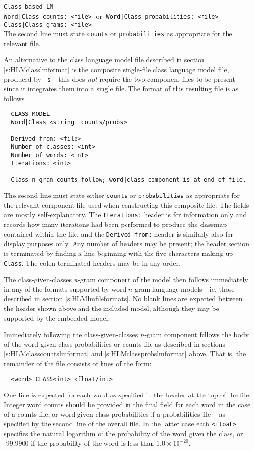 \noindent\texttt{Class-based LM}\\
\texttt{Word|Class counts: <file>} $\;$or$\;$ \texttt{Word|Class probabilities: <file>}\\
\texttt{Class|Class grams: <file>}\\
The second line must state {\tt counts} or {\tt probabilities} as
appropriate for the relevant file.


An alternative to the class language model file described in section
\ref{s:HLMclasslmformat} is the composite single-file class language
model file, produced by { \tt -s} -- this does {\it not}
require the two component files to be present since it integrates them
into a single file.  The format of this resulting file is as follows:

\begin{verbatim}
  CLASS MODEL
  Word|Class <string: counts/probs>

  Derived from: <file>
  Number of classes: <int>
  Number of words: <int>
  Iterations: <int>

  Class n-gram counts follow; word|class component is at end of file.
\end{verbatim}
The second line must state either {\tt counts} or {\tt probabilities} as
appropriate for the relevant component file used when constructing
this composite file.  The fields are mostly self-explanatory.  The
{\tt Iterations:} header is for information only and records how many
iterations had been performed to produce the classmap contained within
the file, and the {\tt Derived from:} header is similarly also for
display purposes only.  Any number of headers may be present; the
header section is terminated by finding a line beginning with the five
characters making up {\tt Class}.  The colon-terminated headers may be
in any order.

The class-given-classes $n$-gram component of the model then follows
immediately in any of the formats supported by word $n$-gram language
models -- ie. those described in section \ref{s:HLMlmfileformats}.  No
blank lines are expected between the header shown above and the
included model, although they may be supported by the embedded model.

Immediately following the class-given-classes $n$-gram component
follows the body of the word-given-class probabilities or counts file
as described in sections \ref{s:HLMclasscountslmformat} and
\ref{s:HLMclassprobslmformat} above.  That is, the remainder of the
file consists of lines of the form:
\begin{verbatim}
  <word> CLASS<int> <float/int>
\end{verbatim}
One line is expected for each word as specified in the header at the
top of the file.  Integer word counts should be provided in the final
field for each word in the case of a counts file, or word-given-class
probabilities if a probabilities file -- as specified by the second
line of the overall file.  In the latter case each {\tt <float>}
specifies the natural logarithm of the probability of the word given
the class, or -99.9900 if the probability of the word is less than
$1.0\times10^{-20}$.


